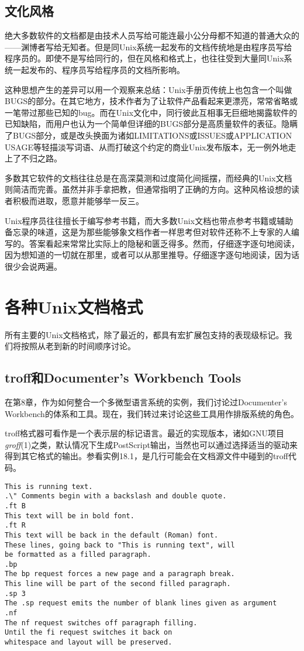 \documentclass[12pt,oneside]{book}
\begin{document}
\begin{common-format}
\subsection{文化风格}
绝大多数软件的文档都是由技术人员写给可能连最小公分母都不知道的普通大众的——渊博者写给无知者。但是同Unix系统一起发布的文档传统地是由程序员写给程序员的。即使不是写给同行的，但在风格和格式上，也往往受到大量同Unix系统一起发布的、程序员写给程序员的文档所影响。

这种思想产生的差异可以用一个观察来总结：Unix手册页传统上也包含一个叫做BUGS的部分。在其它地方，技术作者为了让软件产品看起来更漂亮，常常省略或一笔带过那些已知的bug。而在Unix文化中，同行彼此互相事无巨细地揭露软件的已知缺陷，而用户也认为一个简单但详细的BUGS部分是高质量软件的表征。隐瞒了BUGS部分，或是改头换面为诸如LIMITATIONS或ISSUES或APPLICATION USAGE等轻描淡写词语、从而打破这个约定的商业Unix发布版本，无一例外地走上了不归之路。

多数其它软件的文档往往总是在高深莫测和过度简化间摇摆，而经典的Unix文档则简洁而完善。虽然并非手拿把教，但通常指明了正确的方向。这种风格设想的读者积极而进取，愿意并能够举一反三。

Unix程序员往往擅长于编写参考书籍，而大多数Unix文档也带点参考书籍或辅助备忘录的味道，这是为那些能够象文档作者一样思考但对软件还称不上专家的人编写的。答案看起来常常比实际上的隐秘和匮乏得多。然而，仔细逐字逐句地阅读，因为想知道的一切就在那里，或者可以从那里推导。仔细逐字逐句地阅读，因为话很少会说两遍。

\section{各种Unix文档格式}
所有主要的Unix文档格式，除了最近的，都具有宏扩展包支持的表现级标记。我们将按照从老到新的时间顺序讨论。

\subsection{troff和Documenter's Workbench Tools}
在第8章，作为如何整合一个多微型语言系统的实例，我们讨论过Documenter's Workbench的体系和工具。现在，我们转过来讨论这些工具用作排版系统的角色。

troff格式器可看作是一个表示层的标记语言。最近的实现版本，诸如GNU项目\textit{groff}(1)之类，默认情况下生成PostScript输出，当然也可以通过选择适当的驱动来得到其它格式的输出。参看实例18.1，是几行可能会在文档源文件中碰到的troff代码。
\begin{Verbatim}[label=例18.1  groff(1)标记实例]
This is running text.
.\" Comments begin with a backslash and double quote.
.ft B
This text will be in bold font.
.ft R
This text will be back in the default (Roman) font.
These lines, going back to "This is running text", will 
be formatted as a filled paragraph.
.bp
The bp request forces a new page and a paragraph break.
This line will be part of the second filled paragraph.
.sp 3
The .sp request emits the number of blank lines given as argument
.nf
The nf request switches off paragraph filling.
Until the fi request switches it back on
whitespace and layout will be preserved.


\end{Verbatim}
\end{common-format}
\end{document}
